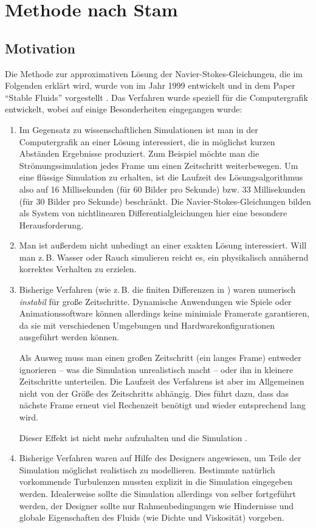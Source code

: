 \section{Methode nach Stam}

\subsection{Motivation}

Die Methode zur approximativen Lösung der Navier-Stokes-Gleichungen, die im
Folgenden erklärt wird, wurde von  im Jahr 1999 entwickelt
und in dem Paper "`Stable Fluids"' vorgestellt \cite{Stam1999}. Das Verfahren
wurde speziell für die Computergrafik entwickelt, wobei auf einige
Besonderheiten eingegangen wurde:

\begin{enumerate}
\item
	Im Gegensatz zu wissenschaftlichen Simulationen ist man in der
	Computergrafik an einer Lösung interessiert, die in möglichst kurzen
	Abständen Ergebnisse produziert. Zum Beispiel möchte man die
	Strömungssimulation jedes Frame um einen Zeitschritt weiterbewegen. Um
	eine flüssige Simulation zu erhalten, ist die Laufzeit des
	Lösungsalgorithmus also auf 16 Millisekunden (für 60 Bilder pro Sekunde)
	bzw. 33 Millisekunden (für 30 Bilder pro Sekunde) beschränkt. Die
	Navier-Stokes-Gleichungen bilden als System von nichtlinearen
	Differentialgleichungen hier eine besondere Herausforderung.
\item
	Man ist außerdem nicht unbedingt an einer exakten Lösung interessiert.
	Will man z.\,B. Wasser oder Rauch simulieren reicht es, ein physikalisch
	annähernd korrektes Verhalten zu erzielen.
\item
	Bisherige Verfahren (wie z.\,B. die finiten Differenzen in
	\cite{Foster1997}) waren numerisch \emph{instabil} für große
	Zeitschritte. Dynamische Anwendungen wie Spiele oder Animationssoftware
	können allerdings keine minimiale Framerate garantieren, da sie mit
	verschiedenen Umgebungen und Hardwarekonfigurationen ausgeführt werden
	können.

	Als Ausweg muss man einen großen Zeitschritt (ein langes Frame) entweder
	ignorieren -- was die Simulation unrealistisch macht -- oder ihn in
	kleinere Zeitschritte unterteilen. Die Laufzeit des Verfahrens ist aber
	im Allgemeinen nicht von der Größe des Zeitschritts abhängig. Dies führt
	dazu, dass das nächste Frame erneut viel Rechenzeit benötigt und wieder
	entsprechend lang wird.

	Dieser Effekt ist nicht mehr aufzuhalten und die Simulation
	.
\item
	Bisherige Verfahren waren auf Hilfe des Designers angewiesen, um Teile
	der Simulation möglichst realistisch zu modellieren. Bestimmte natürlich
	vorkommende Turbulenzen mussten explizit in die Simulation eingegeben
	werden. Idealerweise sollte die Simulation allerdings von selber
	fortgeführt werden, der Designer sollte nur Rahmenbedingungen wie
	Hindernisse und globale Eigenschaften des Fluids (wie Dichte und
	Viskosität) vorgeben.
\end{enumerate}

